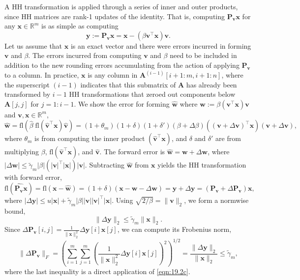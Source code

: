 \documentclass[review,onefignum,onetabnum]{siamart190516}
\newcommand{\R}{\mathbb{R}}
\newcommand{\dd}{\delta}
\newcommand{\tth}{\theta}
\newcommand{\bb}[1]{\mathbf{#1}}
\newcommand{\fl}{\mathrm{fl}}
\begin{document}
A HH transformation is applied through a series of inner and outer products, since HH matrices are rank-1 updates of the identity. 
That is, computing  $\bb{P}_{\bb{v}}\bb{x}$ for any $\bb{x}\in\R^{m}$ is as simple as computing 
\begin{equation}
	\bb{y}:=\bb{P}_{\bb{v}}\bb{x} = \bb{x} - (\beta \bb{v}^{\top}\bb{x})\bb{v}.\label{eqn:effH}
\end{equation}
Let us assume that $\bb{x}$ is an exact vector and there were errors incurred in forming $\bb{v}$ and $\beta$. 
The errors incurred from computing $\bb{v}$ and $\beta$ need to be included in addition to the new rounding errors accumulating from the action of applying $\bb{P}_{\bb{v}}$ to a column.
In practice, $\bb{x}$ is any column in $\bb{A}^{(i-1)}[i+1:m, i+1:n]$, where the superscript $(i-1)$ indicates that this submatrix of $\bb{A}$ has already been transformed by $i-1$ HH transformations that zeroed out components below $\bb{A}[j,j]$ for $j = 1:i-1$.
We show the error for forming $\hat{\bb{w}}$ where $\bb{w}:=\beta(\bb{v}^{\top}\bb{x})\bb{v}$ and $\bb{v},\bb{x}\in\R^{m}$,
\begin{equation*}
\hat{\bb{w}} =\fl(\hat{\beta}\;\fl(\hat{\bb{v}}^{\top}\bb{x})\hat{\bb{v}})=(1+\tth_{m})(1+\dd)(1+\dd')(\beta+\Delta\beta)\left((\bb{v}+\Delta \bb{v})^{\top}\bb{x}\right)(\bb{v}+\Delta \bb{v}),
\end{equation*}
where $\tth_{m}$ is from computing the inner product $(\hat{\bb{v}}^{\top}\bb{x})$, and $\dd$ and $\dd'$ are from multiplying $\beta$, $\fl(\hat{\bb{v}}^{\top}\bb{x})$, and $\bb{\hat{v}}$.
The forward error is
$\hat{\bb{w}} = \bb{w} + \Delta \bb{w}$, where $|\Delta \bb{w}| \leq \tilde{\gamma}_m|\beta|\left(|\bb{v}|^{\top}|\bb{x}|\right)|\bb{v}|.$
Subtracting $\hat{\bb{w}}$ from $\bb{x}$ yields the HH transformation with forward error,
\begin{equation}
\fl(\hat{\bb{P_v}}\bb{x}) = \fl(\bb{x}-\bb{\hat{w}}) = (1+\dd)(\bb{x}-\bb{w}-\Delta \bb{w}) = \bb{y} + \Delta \bb{y} = (\bb{P_v} + \Delta \bb{P_v})\bb{x},\label{eqn:applyP}
\end{equation}
where $|\Delta \bb{y}| \leq u|\bb{x}| + \tilde{\gamma}_{m} |\beta||\bb{v}||\bb{v}|^{\top}|\bb{x}|$.
Using $\sqrt{2/\beta} = \|\bb{v}\|_2$, we form a normwise bound,
\begin{equation}
\|\Delta \bb{y}\|_2 \leq \tilde{\gamma}_{m}\|\bb{x}\|_2. \label{eqn:19.2c}
\end{equation}
Since $\Delta \bb{P_v}[i,j] = \frac{1}{\|\bb{x}\|_2^2}\Delta \bb{y}[i]\bb{x}[j]$, we can compute its Frobenius norm,
	\begin{equation}
	\|\Delta \bb{P_v}\|_F
	= \left(\sum_{i=1}^m\sum_{j=1}^m\left(\frac{1}{\|\bb{x}\|_2^2}\Delta \bb{y}[i]\bb{x}[j]\right)^2\right)^{1/2}
	=  \frac{\|\Delta \bb{y}\|_2}{\|\bb{x}\|_2} \leq \tilde{\gamma}_{m}\label{eqn:outer},
	\end{equation}
where the last inequality is a direct application of \cref{eqn:19.2c}.
\end{document}
